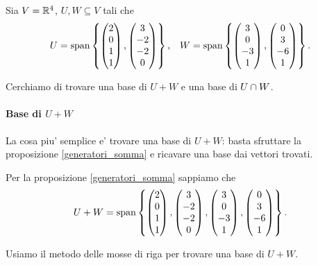 \begin{example}
    Sia $V = \mathbb{R}^4$, $U, W \subseteq V$ tali che \begin{align*}
        U = \operatorname{span}\left\{\begin{pmatrix} 2\\0\\1\\1 \end{pmatrix}, \begin{pmatrix} 3\\-2\\-2\\0 \end{pmatrix}\right\}, &&W = \operatorname{span}\left\{\begin{pmatrix} 3\\0\\-3\\1 \end{pmatrix}, \begin{pmatrix} 0\\3\\-6\\1 \end{pmatrix}\right\}.
    \end{align*}

    Cerchiamo di trovare una base di $U+W$ e una base di $U \cap W$. 

    \paragraph{Base di $U + W$}
    La cosa piu' semplice e' trovare una base di $U+W$: basta sfruttare la proposizione \ref{generatori_somma} e ricavare una base dai vettori trovati.

    Per la proposizione \ref{generatori_somma} sappiamo che \[
        U + W = \operatorname{span}\left\{\begin{pmatrix} 2\\0\\1\\1 \end{pmatrix}, \begin{pmatrix} 3\\-2\\-2\\0 \end{pmatrix}, \begin{pmatrix} 3\\0\\-3\\1 \end{pmatrix}, \begin{pmatrix} 0\\3\\-6\\1 \end{pmatrix}\right\}.  
    \]

    Usiamo il metodo delle mosse di riga per trovare una base di $U + W$.


\end{example}
